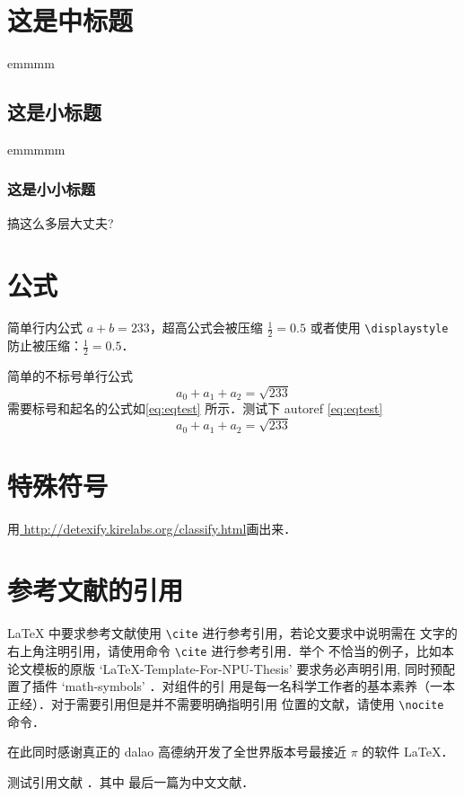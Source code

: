 \documentclass[lang=chs, degree=phd, blindreview=false, adobe=false]{yanputhesis}
\begin{document}
\section{这是中标题}
emmmm
\subsection{这是小标题}
emmmmm
\subsubsection{这是小小标题}
搞这么多层大丈夫?

\section{公式}
简单行内公式 $a+b=233$，超高公式会被压缩 $\frac{1}{2}=0.5$ 或者使用
\lstinline`\displaystyle` 防止被压缩：$\displaystyle \frac{1}{2}=0.5$．

简单的不标号单行公式
$$a_0+a_1+a_2=\sqrt{233}$$
需要标号和起名的公式如\autoref{eq:eqtest} 所示．测试下 autoref \autoref{eq:eqtest}
\begin{equation}
    \label{eq:eqtest}
    a_0 + a_1 + a_2 = \sqrt{233}
\end{equation}

\section{特殊符号}

用\href{http://detexify.kirelabs.org/classify.html}{
    http://detexify.kirelabs.org/classify.html}画出来．

\section{参考文献的引用}

\LaTeX{} 中要求参考文献使用 \lstinline`\cite` 进行参考引用，若论文要求中说明需在
文字的右上角注明引用，请使用命令 \lstinline`\cite` 进行参考引用．举个
不恰当的例子，比如本论文模板的原版
`LaTeX-Template-For-NPU-Thesis'\cite{NWPUThesisLaTeXTemplate} 要求务必声明引用,
同时预配置了插件 `math-symbols' \cite{MathSymbolsinLaTeXbypolossk}．对组件的引
用是每一名科学工作者的基本素养（一本正经）．对于需要引用但是并不需要明确指明引用
位置的文献，请使用 \lstinline`\nocite` 命令．

在此同时感谢真正的 dalao 高德纳开发了全世界版本号最接近 $\pi$ 的软件
\LaTeX \cite{knuth1986the}\nocite{lamport1989latex}．

测试引用文献 \cite{szegedy2015going, shen2021peridynamic, chen2014maiyuan}．其中
最后一篇为中文文献．
\end{document}
